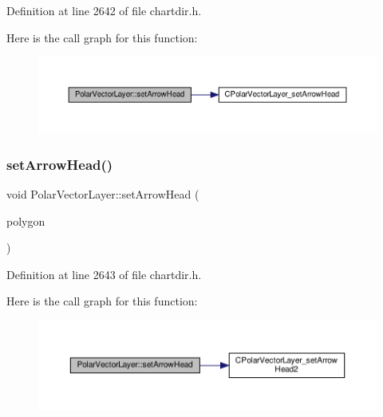 Definition at line 2642 of file chartdir.\+h.

Here is the call graph for this function\+:
\nopagebreak
\begin{figure}[H]
\begin{center}
\leavevmode
\includegraphics[width=350pt]{class_polar_vector_layer_a739707bfc211f48475c65decff37ffb9_cgraph}
\end{center}
\end{figure}
\mbox{\label{class_polar_vector_layer_ac4ef85f3b4cc335f7dba877989ca5ea0}} 
\subsubsection{\texorpdfstring{set\+Arrow\+Head()}{setArrowHead()}\hspace{0.1cm}{\footnotesize\ttfamily [2/2]}}
{\footnotesize\ttfamily void Polar\+Vector\+Layer\+::set\+Arrow\+Head (\begin{DoxyParamCaption}\item[{\hyperlink{class_int_array}{Int\+Array}}]{polygon }\end{DoxyParamCaption})\hspace{0.3cm}{\ttfamily [inline]}}



Definition at line 2643 of file chartdir.\+h.

Here is the call graph for this function\+:
\nopagebreak
\begin{figure}[H]
\begin{center}
\leavevmode
\includegraphics[width=350pt]{class_polar_vector_layer_ac4ef85f3b4cc335f7dba877989ca5ea0_cgraph}
\end{center}
\end{figure}
\mbox{\label{class_polar_vector_layer_a7b3681c192109aa5d4085d625c4bee7c}} 
